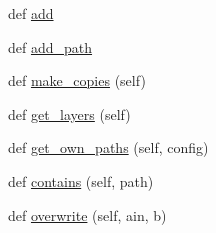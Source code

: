 \begin{DoxyCompactItemize}
def \hyperlink{classpath_1_1_part_a45256181f3975227c838363bc31ae602}{add}
\item 
def \hyperlink{classpath_1_1_part_a961da43effa034ade7b25ff09121784c}{add\+\_\+path}
\item 
def \hyperlink{classpath_1_1_part_a185c9bbf10bddf3b739441e758850c84}{make\+\_\+copies} (self)
\item 
def \hyperlink{classpath_1_1_part_a60a0f2d6c32dc8875b191d432002860f}{get\+\_\+layers} (self)
\item 
def \hyperlink{classpath_1_1_part_a4ce18378dbce97d9a2875e1de9653892}{get\+\_\+own\+\_\+paths} (self, config)
\item 
def \hyperlink{classpath_1_1_part_a674b3be7cd8c25840d27de74b0d94797}{contains} (self, path)
\item 
def \hyperlink{classpath_1_1_part_af5b40fad5803470c54db7d42b07f8a95}{overwrite} (self, ain, b)
\end{DoxyCompactItemize}
